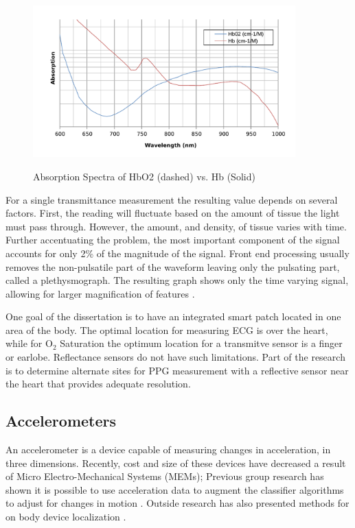 \begin{figure}
	\begin{center}
		\label{fig:Hemoglobin}
		\includegraphics[scale=1,width=0.9\textwidth]{Images/hemoglobin.pdf} 
		\caption{Absorption Spectra of HbO2 (dashed) vs. Hb (Solid) }
	\end{center}
\end{figure}

For a single transmittance measurement the resulting value depends on several factors. First, the reading will fluctuate based on the amount of tissue the light must pass through. However, the amount, and density, of tissue varies with time. Further accentuating the problem, the most important component of the signal accounts for only 2\% of the magnitude of the signal. Front end processing usually removes the non-pulsatile part of the waveform leaving only the pulsating part, called a plethysmograph. The resulting graph shows only the time varying signal, allowing for larger magnification of features \cite{Jawahar2009}.

One goal of the dissertation is to have an integrated smart patch located in one area of the body. The optimal location for measuring ECG is over the heart, while for O$_2$ Saturation the optimum location for a transmitve sensor is a finger or earlobe. Reflectance sensors do not have such limitations. Part of the research is to determine alternate sites for PPG measurement with a reflective sensor near the heart that provides adequate resolution.

\subsection{Accelerometers}
\label{subsec:Accelerometers}
An accelerometer is a device capable of measuring changes in acceleration, in three dimensions. Recently, cost and size of these devices have decreased a result of Micro Electro-Mechanical Systems (MEMs);  Previous group research has shown it is possible to use acceleration data to augment the classifier algorithms to adjust for changes in motion \cite{Shannon2012}.  Outside research has also presented methods for on body device localization \cite{Vahdatpour2011}. 

